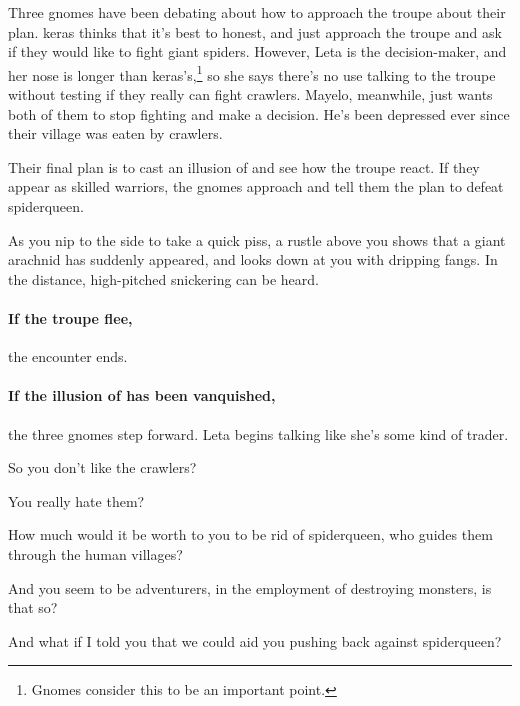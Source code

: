 \begin{exampletext}
  Three gnomes have been debating about how to approach the troupe about their plan.
  \Gls{keras} thinks that it's best to honest, and just approach the troupe and ask if they would like to fight giant spiders.
  However, Leta is the decision-maker, and her nose is longer than \gls{keras}'s,\footnote{Gnomes consider this to be an important point.} so she says there's no use talking to the troupe without testing if they really can fight \glspl{crawler}.
  Mayelo, meanwhile, just wants both of them to stop fighting and make a decision.
  He's been depressed ever since their \gls{village} was eaten by \glspl{crawler}.

  Their final plan is to cast an illusion of  and see how the troupe react.
  If they appear as skilled warriors, the gnomes approach and tell them the plan to defeat \gls{spiderqueen}.
\end{exampletext}

\begin{boxtext}
  As you nip to the side to take a quick piss, a rustle above you shows that a giant arachnid has suddenly appeared, and looks down at you with dripping fangs.
  In the distance, high-pitched snickering can be heard.
\end{boxtext}

\paragraph{If the troupe flee,}
the encounter ends.

\paragraph{If the illusion of  has been vanquished,}
the three gnomes step forward.
Leta begins talking like she's some kind of trader.

\begin{speechtext}
  So you don't like the \glspl{crawler}?

  You really hate them?

  How much would it be worth to you to be rid of \gls{spiderqueen}, who guides them through the human \glspl{village}?

  And you seem to be adventurers, in the employment of destroying monsters, is that so?

  And what if I told you that we could aid you pushing back against \gls{spiderqueen}?
\end{speechtext}

